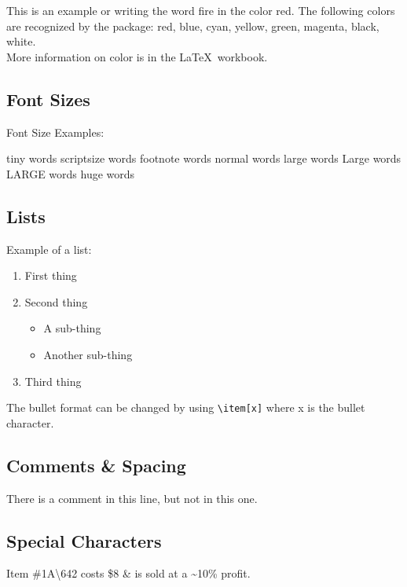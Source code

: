 \documentclass[a4paper, 12pt]{article}
\begin{document}
This is an example or writing the word {\color{red}fire} in the color red.
The following colors are recognized by the package: {\color{red}red}, {\color{blue}blue}, {\color{cyan}cyan}, {\color{yellow}yellow}, {\color{green}green}, {\color{magenta}magenta}, black, white. \\

More information on color is in the \LaTeX\ workbook.

\subsection{Font Sizes}
Font Size Examples:

{\tiny tiny words}
{\scriptsize scriptsize words}
{\footnotesize footnote words}
{\normalsize  normal words}
{\large large words}
{\Large Large words}
{\LARGE LARGE words}
{\huge huge words}




\subsection{Lists}

Example of a list: \\

\begin{enumerate}
\item First thing
\item Second thing
\begin{itemize}
\item A sub-thing
\item Another sub-thing
\end{itemize}
\item Third thing
\end{enumerate}

The bullet format can be changed by using \texttt{\textbackslash item[x]} where x is the bullet character.

\subsection{Comments \& Spacing}
There is a comment in this line, %
but not in this one.

\subsection{Special Characters}

Item \#1A\textbackslash642 costs \$8 \& is sold at a \~{}10\% profit.
\end{document}
